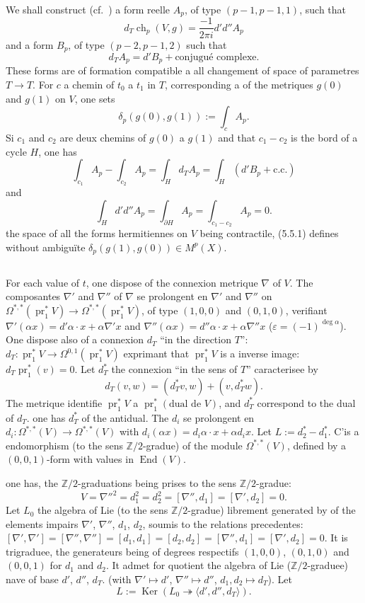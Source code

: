 \documentclass[12pt,a4paper]{article}
\theoremstyle{plain}
\theoremstyle{definition}
\DeclareMathOperator{\Ker}{Ker}
\DeclareMathOperator{\ch}{ch}
\DeclareMathOperator{\End}{End}
\DeclareMathOperator{\pr}{pr}
\newcommand{\ZZ}{\mathbb{Z}}
\begin{document}
We shall construct (cf.~\cite{4}) a form reelle $A_p$, of type $(p-1, p-1,
1)$, such that
\[
d_T \ch_p(V, g) = \frac{-1}{2\pi i} d'd'' A_p
\]
and a form $B_p$, of type $(p-2, p-1, 2)$ such that
\[
d_T A_p = d' B_p + \text{conjugu\'e complexe} .
\]
These forms are of formation compatible a all changement of space of parametres
$T \to T$. For $c$ a chemin of $t_0$ a $t_1$ in $T$, corresponding a of the metriques
$g(0)$ and $g(1)$ on $V$, one sets
\begin{equation}\label{eq:5.5.1}
\delta_p(g(0), g(1)) := \int_c A_p .
\end{equation}
Si $c_1$ and $c_2$ are deux chemins of $g(0)$ a $g(1)$ and that $c_1 - c_2$ is the bord of a cycle $H$, one has
\[
\int_{c_1} A_p - \int_{c_2} A_p = \int_H d_T A_p = \int_H (d' B_p + \text{c.c.})
\]
and
\[
\int_H d'd'' A_p = \int_{\partial H} A_p = \int_{c_1 - c_2} A_p = 0 .
\]
the space of all the forms hermitiennes on $V$ being contractile, (5.5.1)
defines without ambigu\"ite $\delta_p(g(1), g(0)) \in M^p(X)$.

\subsection{}

For each value of $t$, one dispose of the connexion metrique $\nabla$ of $V$.
The composantes $\nabla'$ and $\nabla''$ of $\nabla$ se prolongent en $\nabla'$ and $\nabla''$ on $\Omega^{*,*}(\pr_1^* V) \to
\Omega^{*,*}(\pr_1^* V)$, of type $(1,0,0)$ and $(0,1,0)$, verifiant $\nabla'(\alpha x) = d'\alpha \cdot x + \alpha \nabla' x$
and $\nabla''(\alpha x) = d''\alpha \cdot x + \alpha \nabla'' x$ ($\varepsilon = (-1)^{\deg \alpha}$). One dispose also of a connexion
$d_T$ ``in the direction $T$'': $d_T: \pr_1^* V \to \Omega^{0,1}(\pr_1^* V)$ exprimant that $\pr_1^* V$ is a inverse image: $d_T \pr_1^*(v) = 0$. Let $d_T^*$ the connexion ``in the sens of $T$'' caracterisee
by
\[
d_T(v, w) = (d_T^* v, w) + (v, d_T^* w) .
\]
The metrique identifie $\pr_1^* V$ a $\pr_1^*(\text{dual de } V)$, and $d_T^*$ correspond to the
dual of $d_T$. one has $d_T^*$ of the antidual. The $d_i$ se prolongent en $d_i: \Omega^{*,*}(V) \to \Omega^{*,*}(V)$ with
$d_i(\alpha x) = d_i \alpha \cdot x + \alpha d_i x$. Let $L := d_2^* - d_1^*$. C'is a endomorphism (to the sens
$\ZZ/2$-\-gradue) of the module $\Omega^{*,*}(V)$, defined by a $(0,0,1)$-form with values in $\End(V)$.

one has, the $\ZZ/2$-graduations being prises to the sens $\ZZ/2$-gradue:
\[
V = \nabla''^2 = d_1^2 = d_2^2 = [\nabla'', d_1] = [\nabla', d_2] = 0 .
\]
Let $L_0$ the algebra of Lie (to the sens $\ZZ/2$-gradue) librement generated by of the elements
impairs $\nabla'$, $\nabla''$, $d_1$, $d_2$, soumis to the relations precedentes: $[\nabla', \nabla'] = [\nabla'',
\nabla''] = [d_1, d_1] = [d_2, d_2] = [\nabla'', d_1] = [\nabla', d_2] = 0$. It is trigraduee,
the generateurs being of degrees respectifs $(1,0,0)$, $(0,1,0)$ and $(0,0,1)$ for $d_1$
and $d_2$. It admet for quotient the algebra of Lie ($\ZZ/2$-graduee) nave
of base $d'$, $d''$, $d_T$. (with $\nabla' \mapsto d'$, $\nabla'' \mapsto d''$, $d_1, d_2 \mapsto d_T$). Let
\[
L := \Ker(L_0 \twoheadrightarrow \langle d', d'', d_T \rangle) .
\]
\end{document}
